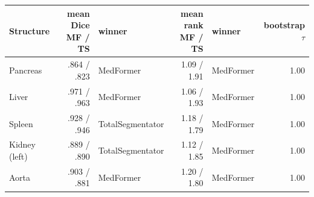 \begin{tabular}{lrlrlr}
\toprule
Structure & mean Dice MF / TS & winner & mean rank MF / TS & winner & bootstrap $\tau$ \\
\midrule
Pancreas & .864 / .823 & MedFormer & 1.09 / 1.91 & MedFormer & 1.00 \\
Liver & .971 / .963 & MedFormer & 1.06 / 1.93 & MedFormer & 1.00 \\
Spleen & .928 / .946 & TotalSegmentator & 1.18 / 1.79 & MedFormer & 1.00 \\
Kidney (left) & .889 / .890 & TotalSegmentator & 1.12 / 1.85 & MedFormer & 1.00 \\
Aorta & .903 / .881 & MedFormer & 1.20 / 1.80 & MedFormer & 1.00 \\
\bottomrule
\end{tabular}
